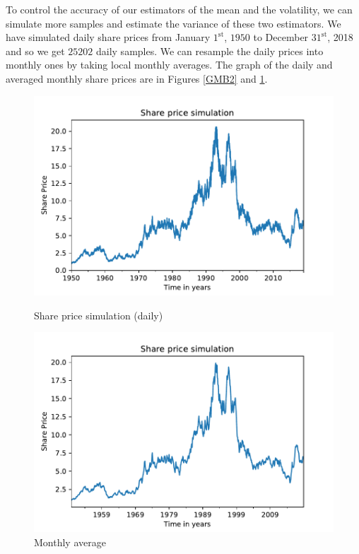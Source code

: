 \documentclass[10pt]{article}
\newenvironment{exercise}[2][Exercise]{\begin{trivlist}
  \item[\hskip \labelsep {\bfseries #1}\hskip \labelsep {\bfseries #2.}]}{\end{trivlist}}
\begin{document}
  \begin{exercise}{2}
    To control the accuracy of our estimators of the mean and the volatility, we can simulate more samples and estimate the variance of these two estimators.
    We have simulated daily share prices from January $1^{\text{st}}$, $1950$ to December $31^{\text{st}}$, 2018 and so we get $25202$ daily samples. We can resample the daily prices into monthly ones by taking local monthly averages. The graph of the daily and averaged monthly share prices are in Figures \ref{GMB2} and \ref{GMB2M}.
    \begin{figure}[H]
      \centering
      \begin{minipage}[b]{0.49\textwidth}
        \includegraphics[width = \textwidth]{Figures/simulation2.pdf}
        \caption{Share price simulation (daily)}
        \label{GMB2}
      \end{minipage}
      \hfill
      \begin{minipage}[b]{0.49\textwidth}
        \includegraphics[width = \textwidth]{Figures/simulation2monthly.pdf}
        \caption{Monthly average}
        \label{GMB2M}
      \end{minipage}	
      \end{figure}
  \end{exercise}
  
\end{document}
